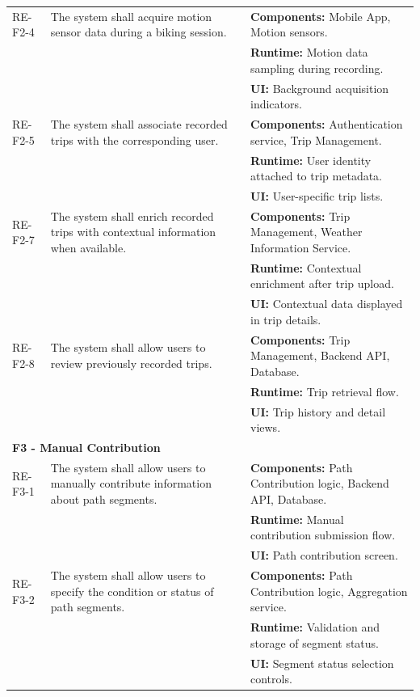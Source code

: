 \begin{longtable}{|p{2.4cm}|p{5.2cm}|p{7cm}|}
RE-F2-4 &
The system shall acquire motion sensor data during a biking session. &
\textbf{Components:} Mobile App, Motion sensors.\\
& & \textbf{Runtime:} Motion data sampling during recording.\\
& & \textbf{UI:} Background acquisition indicators.\\
\hline

RE-F2-5 &
The system shall associate recorded trips with the corresponding user. &
\textbf{Components:} Authentication service, Trip Management.\\
& & \textbf{Runtime:} User identity attached to trip metadata.\\
& & \textbf{UI:} User-specific trip lists.\\
\hline

RE-F2-7 &
The system shall enrich recorded trips with contextual information when available. &
\textbf{Components:} Trip Management, Weather Information Service.\\
& & \textbf{Runtime:} Contextual enrichment after trip upload.\\
& & \textbf{UI:} Contextual data displayed in trip details.\\
\hline

RE-F2-8 &
The system shall allow users to review previously recorded trips. &
\textbf{Components:} Trip Management, Backend API, Database.\\
& & \textbf{Runtime:} Trip retrieval flow.\\
& & \textbf{UI:} Trip history and detail views.\\
\hline


\multicolumn{3}{|l|}{\textbf{F3 - Manual Contribution}}\\
\hline
RE-F3-1 &
The system shall allow users to manually contribute information about path segments. &
\textbf{Components:} Path Contribution logic, Backend API, Database.\\
& & \textbf{Runtime:} Manual contribution submission flow.\\
& & \textbf{UI:} Path contribution screen.\\
\hline

RE-F3-2 &
The system shall allow users to specify the condition or status of path segments. &
\textbf{Components:} Path Contribution logic, Aggregation service.\\
& & \textbf{Runtime:} Validation and storage of segment status.\\
& & \textbf{UI:} Segment status selection controls.\\
\hline


\end{longtable}
